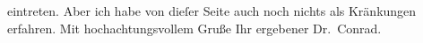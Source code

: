                eintreten. Aber ich habe von dieſer Seite auch noch nichts als Kränkungen erfahren.
               Mit hochachtungsvollem Gruße
               \hspace*{1.5em}
               Ihr ergebener
            \pend
           \pstart \spacefill\mbox{Dr. Conrad.}\pend{}\endnumbering{}  
      